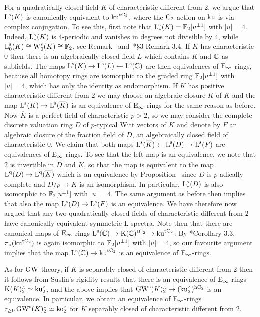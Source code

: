 \begin{example}
\label{ex:algebraically-closed-fields}%
For a quadratically closed field $K$ of characteristic different from 2, we argue that $\operatorname L^{\mathrm{s}}(K)$ is canonically equivalent to $\mathrm{ku}^{{\mathrm{t}\mathrm{C_2}}}$, where the $\mathrm{C_2}$-action on $\mathrm{ku}$ is via complex conjugation. To see this, first note that $\operatorname L^{\mathrm{s}}_*(K) = \mathbb{F}_2[u^{\pm1}]$ with $|u|=4$. Indeed, $\operatorname L^{\mathrm{s}}_*(K)$ is 4-periodic and vanishes in degrees not divisible by $4$, while $\operatorname L_0^{\mathrm{s}}(K) \cong \operatorname W_0^{\mathrm{s}}(K) \cong \mathbb{F}_2$, see Remark~
and~\cite{milnor-symmetric}*{\S 3 Remark 3.4}. If $K$ has characteristic $0$ then there is an algebraically closed field $L$ which contains $K$ and $\mathbb{C}$ as subfields. The maps $\operatorname L^{\mathrm{s}}(K) \to \operatorname L^{\mathrm{s}}(L) \leftarrow \operatorname L^{\mathrm{s}}(\mathbb{C})$ are then equivalences of ${\mathrm{E}_{\infty}}$-rings, because all homotopy rings are isomorphic to the graded ring $\mathbb{F}_2[u^{\pm1}]$ with $|u|=4$, which has only the identity as endomorphism. If $K$ has positive characteristic different from $2$ we may choose an algebraic closure $\overline{K}$ of $K$ and the map $\operatorname L^{\mathrm{s}}(K) \to \operatorname L^{\mathrm{s}}(\overline{K})$ is an equivalence of ${\mathrm{E}_{\infty}}$-rings for the same reason as before. Now $\overline{K}$ is a perfect field of characteristic $p >2$, so we may consider the complete discrete valuation ring $D$ of $p$-typical Witt vectors of $\overline{K}$ and denote by $F$ an algebraic closure of the fraction field of $D$, an algebraically closed field of characteristic $0$. We claim that both maps $\operatorname L^{\mathrm{s}}(\overline{K}) \leftarrow \operatorname L^{\mathrm{s}}(D) \to \operatorname L^{\mathrm{s}}(F)$ are equivalences of ${\mathrm{E}_{\infty}}$-rings. To see that the left map is an equivalence, we note that $2$ is invertible in $D$ and $\overline{K}$, so that the map is equivalent to the map $\operatorname L^{\mathrm{q}}(D) \to \operatorname L^{\mathrm{q}}(\overline{K})$ which is an equivalence by Proposition~ since $D$ is $p$-adically complete and $D/p \to K$ is an isomorphism. In particular, $\operatorname L^{\mathrm{s}}_*(D)$ is also isomorphic to $\mathbb{F}_2[u^{\pm1}]$ with $|u|=4$. The same argument as before then implies that also the map $\operatorname L^{\mathrm{s}}(D) \to \operatorname L^{\mathrm{s}}(F)$ is an equivalence. We have therefore now argued that any two quadratically closed fields of characteristic different from $2$ have canonically equivalent symmetric L-spectra. Note then that there are canonical maps of ${\mathrm{E}_{\infty}}$-rings $\operatorname L^{\mathrm{s}}(\mathbb{C}) \to \operatorname K(\mathbb{C})^{{\mathrm{t}\mathrm{C_2}}} \to \mathrm{ku}^{{\mathrm{t}\mathrm{C_2}}}$. By \cite{Greenlees-reality}*{Corollary 3.3}, $\pi_*(\mathrm{ku}^{{\mathrm{t}\mathrm{C_2}}})$ is again isomorphic to $\mathbb{F}_2[u^{\pm1}]$ with $|u|=4$, so our favourite argument implies that the map $\operatorname L^{\mathrm{s}}(\mathbb{C}) \to \mathrm{ku}^{{\mathrm{t}\mathrm{C_2}}}$ is an equivalence of ${\mathrm{E}_{\infty}}$-rings.

As for $\operatorname{GW}$-theory, if $K$ is separably closed of characteristic different from 2 then it follows from Suslin's rigidity results that there is an 
equivalence of ${\mathrm{E}_{\infty}}$-rings $\operatorname K(K)^{\scriptscriptstyle\wedge}_2 \simeq \mathrm{ku}^{\scriptscriptstyle\wedge}_2$, and the above implies that $\operatorname{GW}^{\mathrm{s}}(K)^{\scriptscriptstyle\wedge}_2 \to (\mathrm{ku}^{\scriptscriptstyle\wedge}_2)^{{\mathrm{h}\mathrm{C_2}}}$ is an equivalence. In particular, we obtain an equivalence of ${\mathrm{E}_{\infty}}$-rings $\tau_{\geq0} \operatorname{GW}^{\mathrm{s}}(K)^{\scriptscriptstyle\wedge}_2 \simeq \mathrm{ko}^{\scriptscriptstyle\wedge}_2$ for $K$ separably closed of characteristic different from $2$.
\end{example}

